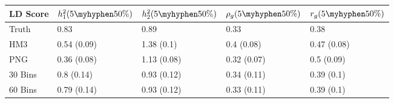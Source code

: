\begin{table}[ht]
\centering
\begin{tabular}{lllll}
  \hline
LD Score & $h^2_1(5\myhyphen50\%)$ & $h^2_2(5\myhyphen50\%)$ & $\rho_g(5\myhyphen50\%)$ & $r_g(5\myhyphen50\%)$ \\ 
  \hline
Truth & 0.83 & 0.89 & 0.33 & 0.38 \\ 
  HM3 & 0.54 (0.09) & 1.38 (0.1) & 0.4 (0.08) & 0.47 (0.08) \\ 
  PNG & 0.36 (0.08) & 1.13 (0.08) & 0.32 (0.07) & 0.5 (0.09) \\ 
  30 Bins & 0.8 (0.14) & 0.93 (0.12) & 0.34 (0.11) & 0.39 (0.1) \\ 
  60 Bins & 0.79 (0.14) & 0.93 (0.12) & 0.33 (0.11) & 0.39 (0.1) \\ 
   \hline
\end{tabular}
\end{table}
